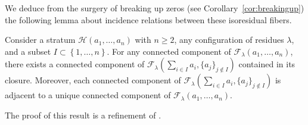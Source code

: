 We deduce from the surgery of breaking up zeros (see Corollary~\ref{cor:breakingup}) the following lemma about incidence relations between these isoresidual fibers.

\begin{lem}\label{lem:incidence}
Consider a stratum $\mathcal{H}(a_{1},\dots,a_{n})$ with $n \geq 2$, any configuration of residues $\lambda$, and a subset $I\subset \left\{1,\dots,n\right\}$. For any connected component of $\mathcal{F}_{\lambda}(a_{1},\dots,a_{n})$, there exists a connected component of $\mathcal{F}_{\lambda}(\sum_{i\in I} a_{i},\lbrace a_{j}\rbrace_{j\notin I})$ contained in its closure. Moreover, each connected component of $\mathcal{F}_{\lambda}(\sum_{i\in I} a_{i},\lbrace a_{j}\rbrace_{j\notin I})$ is adjacent to a unique connected component of $\mathcal{F}_{\lambda}(a_{1},\dots,a_{n})$.
\end{lem}

The proof of this result is a refinement of \cite[Prop.\,7.1 \&~7.2]{Bo}.

